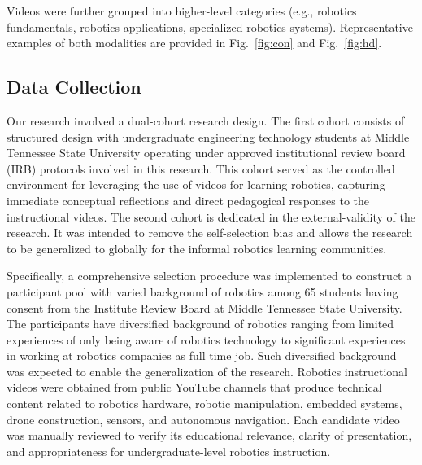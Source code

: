 Videos were further grouped into higher-level categories (e.g., robotics fundamentals, robotics applications, specialized robotics systems). Representative examples of both modalities are provided in Fig.~\ref{fig:con} and Fig.~\ref{fig:hd}.

\subsection {Data Collection}


Our research involved a dual-cohort research design. The first cohort consists of structured design with undergraduate engineering technology students at Middle Tennessee State University operating under approved institutional review board (IRB) protocols involved in this research. This cohort served as the controlled environment for leveraging the use of videos for learning robotics, capturing immediate conceptual reflections and direct pedagogical responses to the instructional videos. The second cohort is dedicated in the external-validity of the research. It was intended to remove the self-selection bias and allows the research to be generalized to globally for the informal robotics learning communities. 


Specifically, a comprehensive selection procedure was implemented to construct a participant pool with varied background of robotics among 65 students having consent from the Institute Review Board at Middle Tennessee State University. The participants have diversified background of robotics ranging from limited experiences of only being aware of robotics technology to significant experiences in working at robotics companies as full time job. Such diversified background was expected to enable the generalization of the research. Robotics instructional videos were obtained from public YouTube channels that produce technical content related to robotics hardware, robotic manipulation, embedded systems, drone construction, sensors, and autonomous navigation. Each candidate video was manually reviewed to verify its educational relevance, clarity of presentation, and appropriateness for undergraduate-level robotics instruction.


